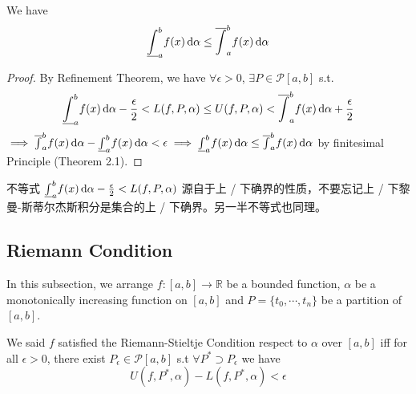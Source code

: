 \documentclass[
	UTF-8,
	11pt, %
	a4paper, %
]{LegrandOrangeBook}
\begin{document}
    \begin{theorem}
        We have 
        $$
            \underline{\int}_{a}^{b}f(x) \, \mathrm{d} \alpha \leq \overline{\int}_{a}^{b}f(x) \, \mathrm{d} \alpha
        $$

    \end{theorem}

    \begin{proof}
        By Refinement Theorem, we have $\forall \epsilon >0 $, $\exists P \in \mathcal{P}[a,b]$ s.t.
        $$
        \underline{\int}_{a}^{b}f(x) \, \mathrm{d} \alpha - {\epsilon \over 2} < L(f , P, \alpha) \leq U(f , P, \alpha) <\overline{\int}_{a}^{b}f(x) \, \mathrm{d} \alpha  + {\epsilon \over 2}
        $$
        $\implies \overline{\int}_{a}^{b}f(x) \, \mathrm{d} \alpha - \underline{\int}_{a}^{b}f(x) \, \mathrm{d} \alpha < \epsilon \implies \underline{\int}_{a}^{b}f(x) \, \mathrm{d} \alpha \leq \overline{\int}_{a}^{b}f(x) \, \mathrm{d} \alpha$ 
        by finitesimal Principle (Theorem 2.1).
    \end{proof}

    \begin{remark}
        不等式
        $
        \underline{\int}_{a}^{b}f(x) \, \mathrm{d} \alpha - {\epsilon \over 2} < L(f , P, \alpha)
        $
        源自于上 / 下确界的性质，不要忘记上 / 下黎曼-斯蒂尔杰斯积分是集合的上 / 下确界。另一半不等式也同理。
    \end{remark}

    \newpage

    \subsection{Riemann Condition}

        In this subsection, we arrange $f: [a, b] \to \mathbb{R} $ be a bounded function,
        $\alpha$ be a monotonically increasing function on $[a, b]$ and $P=\{t_0,\cdots, t_n\}$ 
        be a partition of $[a,b]$.

    \begin{definition}
    
        We said $f$ satisfied the Riemann-Stieltje Condition respect to $\alpha$ over $[a,b]$ iff 
        for all  $\epsilon > 0$, 
        there exist $P_{\epsilon} \in \mathcal{P}[a,b]$ s.t $\forall P^{*} \supset P_{\epsilon}$ we have
        $$
            U(f,P^{*},\alpha) - L(f,P^{*},\alpha) < \epsilon
        $$

    \end{definition}
\end{document}
